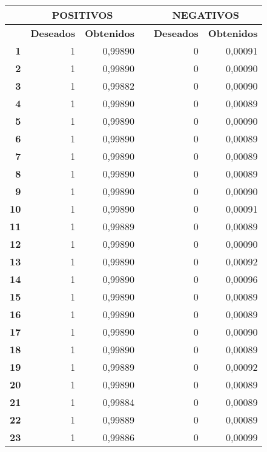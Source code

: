 {\tiny 
\begin{longtable}{|r|r|r|l|r|r|}
\hline
\multicolumn{1}{|l|}{} & \multicolumn{2}{c|}{\textbf{POSITIVOS}} &  & \multicolumn{2}{c|}{\textbf{NEGATIVOS}} \\ \hline
\multicolumn{1}{|l|}{} & \multicolumn{1}{c|}{\textbf{Deseados}} & \multicolumn{1}{c|}{\textbf{Obtenidos}} &  & \multicolumn{1}{c|}{\textbf{Deseados}} & \multicolumn{1}{c|}{\textbf{Obtenidos}} \\ \hline
\textbf{1} & 1 & 0,99890 &  & 0 & 0,00091 \\ \hline
\textbf{2} & 1 & 0,99890 &  & 0 & 0,00090 \\ \hline
\textbf{3} & 1 & 0,99882 &  & 0 & 0,00090 \\ \hline
\textbf{4} & 1 & 0,99890 &  & 0 & 0,00089 \\ \hline
\textbf{5} & 1 & 0,99890 &  & 0 & 0,00090 \\ \hline
\textbf{6} & 1 & 0,99890 &  & 0 & 0,00089 \\ \hline
\textbf{7} & 1 & 0,99890 &  & 0 & 0,00089 \\ \hline
\textbf{8} & 1 & 0,99890 &  & 0 & 0,00089 \\ \hline
\textbf{9} & 1 & 0,99890 &  & 0 & 0,00090 \\ \hline
\textbf{10} & 1 & 0,99890 &  & 0 & 0,00091 \\ \hline
\textbf{11} & 1 & 0,99889 &  & 0 & 0,00089 \\ \hline
\textbf{12} & 1 & 0,99890 &  & 0 & 0,00090 \\ \hline
\textbf{13} & 1 & 0,99890 &  & 0 & 0,00092 \\ \hline
\textbf{14} & 1 & 0,99890 &  & 0 & 0,00096 \\ \hline
\textbf{15} & 1 & 0,99890 &  & 0 & 0,00089 \\ \hline
\textbf{16} & 1 & 0,99890 &  & 0 & 0,00089 \\ \hline
\textbf{17} & 1 & 0,99890 &  & 0 & 0,00090 \\ \hline
\textbf{18} & 1 & 0,99890 &  & 0 & 0,00089 \\ \hline
\textbf{19} & 1 & 0,99889 &  & 0 & 0,00092 \\ \hline
\textbf{20} & 1 & 0,99890 &  & 0 & 0,00089 \\ \hline
\textbf{21} & 1 & 0,99884 &  & 0 & 0,00089 \\ \hline
\textbf{22} & 1 & 0,99889 &  & 0 & 0,00089 \\ \hline
\textbf{23} & 1 & 0,99886 &  & 0 & 0,00099 \\ \hline

\end{longtable}}
